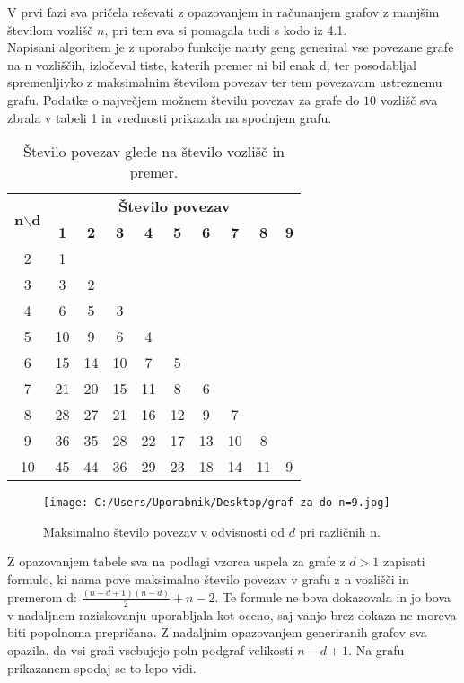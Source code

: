 \documentclass[12pt,a4paper]{amsart}
\theoremstyle{definition} %
\theoremstyle{plain} %
\begin{document}
\noindent V prvi fazi sva pričela reševati z opazovanjem in računanjem grafov z manjšim številom vozlišč $n$, pri tem sva si
pomagala tudi s kodo iz 4.1. \\

\noindent Napisani algoritem je z uporabo funkcije nauty geng generiral vse povezane grafe na n vozliščih, izločeval tiste, katerih premer ni bil enak d, ter posodabljal spremenljivko z
maksimalnim številom povezav ter tem povezavam ustreznemu grafu. Podatke o največjem možnem številu povezav za grafe do $10$ vozlišč sva zbrala v tabeli 1 in vrednosti prikazala na
spodnjem grafu.

\vspace{-7em}

\begin{table}[h]
    \centering
    \begin{tabular}{|c|*{9}{c|}} 
    \hline
    \multirow{2}{*}{\textbf{n$\backslash$d}} & \multicolumn{9}{c|}{\textbf{Število povezav}} \\ \cline{2-10}
    & \textbf{1} & \textbf{2} & \textbf{3} & \textbf{4} & \textbf{5} & \textbf{6} & \textbf{7} & \textbf{8} & \textbf{9} \\ 
    \hline
    2 & 1 & & & & & & & & \\ 
    3 & 3 & 2 & & & & & & & \\ 
    4 & 6 & 5 & 3 & & & & & & \\
    5 & 10 & 9 & 6 & 4 & & & & & \\
    6 & 15 & 14 & 10 & 7 & 5 & & & & \\ 
    7 & 21 & 20 & 15 & 11 & 8 & 6 & & & \\ 
    8 & 28 & 27 & 21 & 16 & 12 & 9 & 7 & & \\ 
    9 & 36 & 35 & 28 & 22 & 17 & 13 & 10 & 8 & \\ 
    10 & 45 & 44 & 36 & 29 & 23 & 18 & 14 & 11 & 9 \\ 
    \hline
    \end{tabular}
    \caption{Število povezav glede na število vozlišč in premer.}
    \label{tab:tabela1}
\end{table}

\begin{figure}[h]
    \centering
    \texttt{[image: C:/Users/Uporabnik/Desktop/graf za do n=9.jpg]}
    \caption{Maksimalno število povezav v odvisnosti od \(d\) pri različnih n.}
    \label{fig:slika1}
\end{figure}

\pagebreak
\noindent Z opazovanjem tabele sva na podlagi vzorca uspela za grafe z $d > 1$ zapisati formulo, ki nama pove
maksimalno število povezav v grafu z n vozlišči in premerom d: $\frac{(n - d + 1)(n - d)}{2} + n - 2$. Te formule
ne bova dokazovala in jo bova v nadaljnem raziskovanju uporabljala kot oceno, saj vanjo brez dokaza ne moreva biti
popolnoma prepričana. \newline 
Z nadaljnim opazovanjem generiranih grafov sva opazila, da vsi grafi vsebujejo poln podgraf velikosti $n - d + 1$. Na grafu prikazanem spodaj
se to lepo vidi. \\
\end{document}
